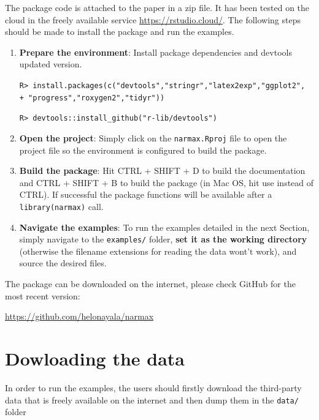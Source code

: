 \documentclass[preprint,12pt, a4paper]{elsarticle}
\begin{document}
The package code is attached to the paper in a zip file. It has been tested on the cloud in the freely available service \url{https://rstudio.cloud/}. The following steps should be made to install the package and run the examples.
\begin{enumerate}[Step 1:]
	\item \textbf{Prepare the environment}: Install package dependencies and devtools updated version.
	
	\verb|R> install.packages(c("devtools","stringr","latex2exp","ggplot2",|
	\verb|	+ "progress","roxygen2","tidyr"))|
	
	\verb|R> devtools::install_github("r-lib/devtools")|
	
	\item \textbf{Open the project}: Simply click on the \verb|narmax.Rproj| file to open the project file so the environment is configured to build the package.
	
	\item \textbf{Build the package}: Hit CTRL + SHIFT + D to build the documentation and CTRL + SHIFT + B to build the package (in Mac OS, hit use instead of CTRL). If successful the package functions will be available after a \verb|library(narmax)| call.
	
	\item \textbf{Navigate the examples}: To run the examples detailed in the next Section, simply navigate to the \verb|examples/| folder, \textbf{set it as the working directory} (otherwise the filename extensions for reading the data wont't work), and source the desired files.		
\end{enumerate}

The package can be downloaded on the internet, please check GitHub for the most recent version:

\url{https://github.com/helonayala/narmax}

\section{Dowloading the data}  \label{sec:examples}

In order to run the examples, the users should firstly download the third-party data that is freely available on the internet and then dump them in the \verb|data/| folder  
\end{document}
